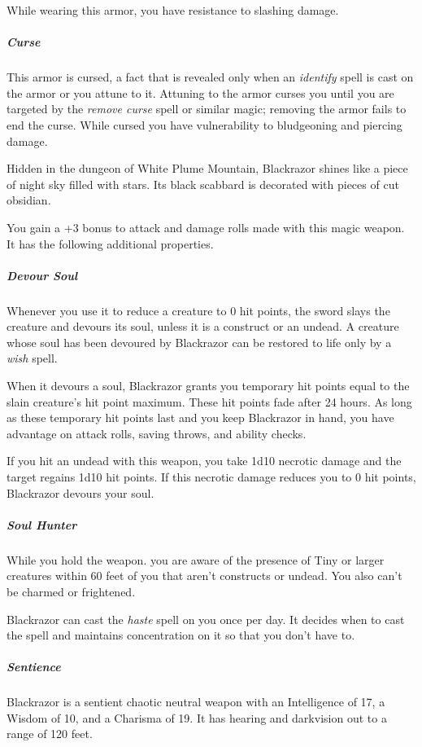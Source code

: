 \documentclass[10pt,a4paper,twoside,bg=print,twocolumn,openany,nodeprecatedcode]{dndbook}
\begin{document}
While wearing this armor, you have resistance to slashing damage.

\subparagraph{Curse}
This armor is cursed, a fact that is revealed only when an \textit{identify} spell is cast on the armor or you attune to it. Attuning to the armor curses you until you are targeted by the \textit{remove curse} spell or similar magic; removing the armor fails to end the curse. While cursed you have vulnerability to bludgeoning and piercing damage.

Hidden in the dungeon of White Plume Mountain, Blackrazor shines like a piece of night sky filled with stars. Its black scabbard is decorated with pieces of cut obsidian.

You gain a +3 bonus to attack and damage rolls made with this magic weapon. It has the following additional properties.

\subparagraph{Devour Soul}
Whenever you use it to reduce a creature to 0 hit points, the sword slays the creature and devours its soul, unless it is a construct or an undead. A creature whose soul has been devoured by Blackrazor can be restored to life only by a \textit{wish} spell.

When it devours a soul, Blackrazor grants you temporary hit points equal to the slain creature's hit point maximum. These hit points fade after 24 hours. As long as these temporary hit points last and you keep Blackrazor in hand, you have advantage on attack rolls, saving throws, and ability checks.

If you hit an undead with this weapon, you take 1d10 necrotic damage and the target regains 1d10 hit points. If this necrotic damage reduces you to 0 hit points, Blackrazor devours your soul.

\subparagraph{Soul Hunter}
While you hold the weapon. you are aware of the presence of Tiny or larger creatures within 60 feet of you that aren't constructs or undead. You also can't be charmed or frightened.

Blackrazor can cast the \textit{haste} spell on you once per day. It decides when to cast the spell and maintains concentration on it so that you don't have to.

\subparagraph{Sentience}
Blackrazor is a sentient chaotic neutral weapon with an Intelligence of 17, a Wisdom of 10, and a Charisma of 19. It has hearing and darkvision out to a range of 120 feet.
\end{document}
